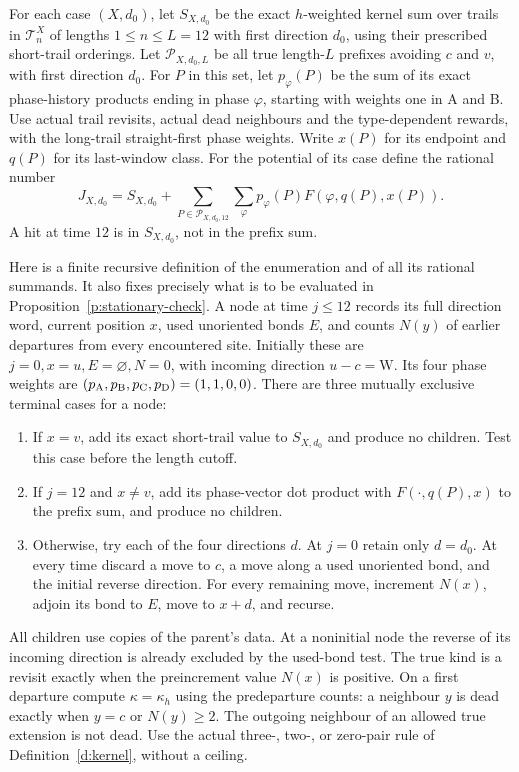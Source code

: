 \begin{definition}\label{d:prefix-bound}
For each case \((X,d_0)\), let \(S_{X,d_0}\) be the exact
\(h\)-weighted kernel sum over trails in \(\mathcal T_n^X\) of lengths
\(1\le n\le L=12\)
with first direction \(d_0\), using their prescribed short-trail orderings.
Let \(\mathcal P_{X,d_0,L}\) be all true length-\(L\) prefixes
avoiding \(c\) and \(v\), with first direction \(d_0\).
For \(P\) in this set, let \(p_\varphi(P)\) be the sum of its
exact phase-history products ending in phase \(\varphi\), starting
with weights one in A and B. Use actual trail revisits, actual dead
neighbours and the type-dependent rewards, with the long-trail
straight-first phase weights.
Write \(x(P)\) for its endpoint and \(q(P)\) for its last-window class.
For the potential of its case define the rational number
\[
 J_{X,d_0}=S_{X,d_0}
       +\sum_{P\in\mathcal P_{X,d_0,12}}\sum_\varphi
                    p_\varphi(P)F(\varphi,q(P),x(P)).
\]
A hit at time \(12\) is in \(S_{X,d_0}\), not in the prefix sum.
\end{definition}

Here is a finite recursive definition of the enumeration and of all
its rational summands. It also fixes precisely what is to be
evaluated in Proposition~\ref{p:stationary-check}. A node at time
\(j\le12\) records its full direction word, current position \(x\),
used unoriented bonds \(E\), and counts \(N(y)\) of earlier
departures from every encountered site. Initially these are
\(j=0,x=u,E=\varnothing,N=0\), with incoming direction
\(u-c=\mathrm W\). Its four phase weights are
\((p_{\rm A},p_{\rm B},p_{\rm C},p_{\rm D})=(1,1,0,0)\).
There are three mutually exclusive terminal cases for a node:
\begin{enumerate}
\item If \(x=v\), add its exact short-trail value to \(S_{X,d_0}\)
and produce no children. Test this case before the length cutoff.
\item If \(j=12\) and \(x\ne v\), add its phase-vector dot product
with \(F(\cdot,q(P),x)\) to the prefix sum, and produce no children.
\item Otherwise, try each of the four directions \(d\). At
\(j=0\) retain only \(d=d_0\). At every time discard a move to
\(c\), a move along a used unoriented bond, and the initial
reverse direction. For every remaining move, increment \(N(x)\),
adjoin its bond to \(E\), move to \(x+d\), and recurse.
\end{enumerate}
All children use copies of the parent's data. At a noninitial node
the reverse of its incoming direction is already excluded by the
used-bond test. The true kind is a revisit exactly when the
preincrement value \(N(x)\) is positive. On a first departure
compute \(\kappa=\kappa_h\) using the predeparture counts: a
neighbour \(y\) is dead exactly when \(y=c\) or \(N(y)\ge2\).
The outgoing neighbour of an allowed true extension is not dead.
Use the actual three-, two-, or zero-pair rule of
Definition~\ref{d:kernel}, without a ceiling.

